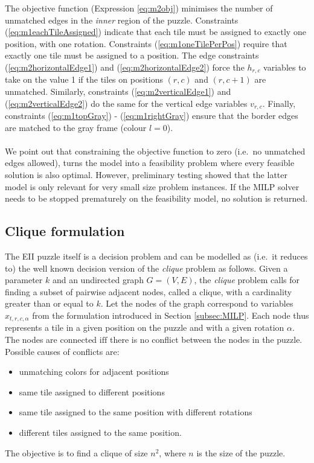 \documentclass[preprint,12pt]{elsarticle}
\begin{document}
{\noindent
The objective function (Expression \ref{eq:m2obj}) minimises the number of unmatched edges in the \textit{inner} region of the puzzle.
Constraints (\ref{eq:m1eachTileAssigned}) indicate that each tile must be assigned to exactly one position, with one rotation.
Constraints (\ref{eq:m1oneTilePerPos}) require that exactly one tile must be assigned to a position.
The edge constraints (\ref{eq:m2horizontalEdge1}) and (\ref{eq:m2horizontalEdge2}) force the $h_{r,c}$ variables to take on the value 1 if the tiles on positions $(r,c)$ and $(r,c+1)$ are unmatched.
Similarly, constraints (\ref{eq:m2verticalEdge1}) and (\ref{eq:m2verticalEdge2}) do the same for the vertical edge variables $v_{r,c}$.
Finally, constraints (\ref{eq:m1topGray}) - (\ref{eq:m1rightGray}) ensure that the border edges are matched to the gray frame (colour $l=0$).
\\
\\
We point out that constraining the objective function to zero (i.e.\ no unmatched edges allowed), turns the model into a feasibility problem where every feasible solution is also optimal.
However, preliminary testing showed that the latter model is only relevant for very small size problem instances.
If the MILP solver needs to be stopped prematurely on the feasibility model, no solution is returned.


\subsection{Clique formulation}
\label{subsec:clique}

\noindent
The EII puzzle itself is a decision problem and can be modelled as (i.e.\ it reduces to) the well known decision version of the \textit{clique} problem \cite{BBPP99} as follows.
Given a parameter $k$ and an undirected graph $G=(V,E)$, the \textit{clique} problem calls for finding a subset of pairwise adjacent nodes, called a clique, with a cardinality greater than or equal to $k$.
Let the nodes of the graph correspond to variables $x_{t,r,c,\alpha}$ from the formulation introduced in Section \ref{subsec:MILP}. Each node thus represents a tile in a given position on the puzzle and with a given rotation $\alpha$. 
The nodes are connected $\mathrm{iff}$ there is no conflict between the nodes in the puzzle.
Possible causes of conflicts are:
\begin{itemize}
	\item unmatching colors for adjacent positions
	\item same tile assigned to different positions
	\item same tile assigned to the same position with different rotations
	\item different tiles assigned to the same position.
\end{itemize}
The objective is to find a clique of size $n^2$, where $n$ is the size of the puzzle. %
}
\end{document}
